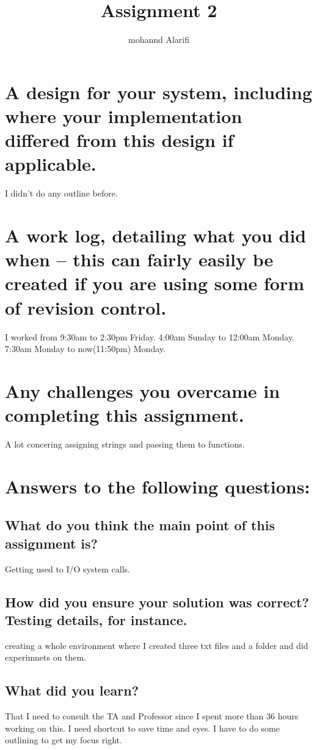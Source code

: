 \documentclass[a4paper]{article}
\title{Assignment 2}
\author{mohannd Alarifi}
\begin{document}
\maketitle

\section{A design for your system, including where your implementation differed from this design if applicable.}
		I didn't do any outline before. 

\section{A work log, detailing what you did when – this can fairly easily be created if you are using some form of revision control.}
	I worked from 9:30am to 2:30pm Friday.
    			  4:00am Sunday to 12:00am Monday.
                  7:30am Monday to now(11:50pm) Monday.

\section{ Any challenges you overcame in completing this assignment.}
	A lot concering assigning strings and passing them to functions.
\section{Answers to the following questions:}

\subsection{ What do you think the main point of this assignment is?}
	Getting used to I/O system calls.
\subsection{  How did you ensure your solution was correct? Testing details, for instance.}
	creating a whole environment where I created three txt files and a folder and did experimnets on them.
\subsection{ What did you learn?}
	That I need to consult the TA and Professor since I spent more than 36 hours working on this. I need shortcut to save time and eyes. I have to do some outlining to get my focus right.
\end{document}
